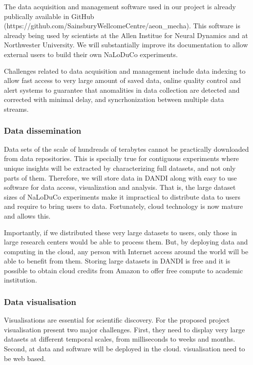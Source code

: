 The data acquisition and management software used in our project is already
publically available in GitHub
(https://github.com/SainsburyWellcomeCentre/aeon\_mecha).
%
This software is already being used by scientists at the Allen Institue for
Neural Dynamics and at Northwester University.
%
We will substantially improve its documentation to allow external users to
build their own NaLoDuCo experiments.

Challenges related to data acquisition and management include data indexing to
allow fast access to very large amount of saved data, online quality control
and alert systems to guarantee that anomalities in data collection are detected
and corrected with minimal delay, and syncrhonization between multiple data
streams.

\subsubsection{Data dissemination}

Data sets of the scale of hundreads of terabytes cannot be practically
downloaded from data repositories. This is specially true for contiguous
experiments where unique insights will be extracted by characterizing full
datasets, and not only parts of them.
%
Therefore, we will store data in DANDI along with easy to use software for
data access, visualization and analysis.
%
That is, the large dataset sizes of NaLoDuCo experiments make it impractical to
distribute data to users and require to bring users to data.
%
Fortunately, cloud technology is now mature and allows this.

Importantly, if we distributed these very large datasets to users, only those
in large research centers would be able to process them. But, by deploying data
and computing in the cloud, any person with Internet access around the world
will be able to benefit from them.
%
Storing large datasets in DANDI is free and it is possible to obtain cloud
credits from Amazon to offer free compute to academic institution.

\subsubsection{Data visualisation}

Visualisations are essential for scientific discovery.
%
For the proposed project visualisation present two major challenges. First, they need
to display very large datasets at different temporal scales, from milliseconds
to weeks and months. Second, at data and software will be deployed in the
cloud. visualisation need to be web based.

